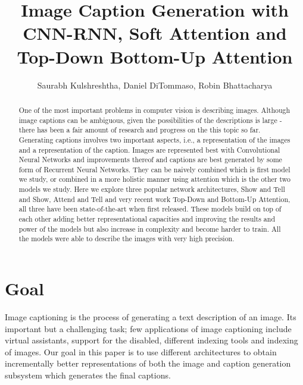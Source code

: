 \documentclass[a4paper]{article}
\begin{document}
\title{Image Caption Generation with CNN-RNN, Soft Attention and Top-Down Bottom-Up Attention}
%
\author{Saurabh Kulshreshtha, Daniel DiTommaso, Robin Bhattacharya}

\maketitle              %

\begin{abstract}
\noindent One of the most important problems in computer vision is describing images. Although image captions can be ambiguous, given the possibilities of the descriptions is large - there has been a fair amount of research and progress on the this topic so far. Generating captions involves two important aspects, i.e., a representation of the images and a representation of the caption. Images are represented best with Convolutional Neural Networks and improvements thereof and captions are best generated by some form of Recurrent Neural Networks. They can be naively combined which is first model we study, or combined in a more holistic manner using attention which is the other two models we study. Here we explore three popular network architectures, Show and Tell\cite{DBLP:journals/corr/VinyalsTBE14} and Show, Attend and Tell\cite{DBLP:journals/corr/XuBKCCSZB15} and very recent work Top-Down and Bottom-Up Attention\cite{DBLP:journals/corr/AndersonHBTJGZ17}, all three have been state-of-the-art when first released. These models build on top of each other adding better representational capacities and improving the results and power of the models but also increase in complexity and become harder to train. All the models were able to describe the images with very high precision.
\end{abstract}
\section{Goal}
Image captioning is the process of generating a text description of an image. Its important but a challenging task; few applications of image captioning include virtual assistants, support for the disabled, different indexing tools and indexing of images.  Our goal in this paper is to use different architectures to obtain incrementally better representations of both the image and caption generation subsystem which generates the final captions.
\end{document}
